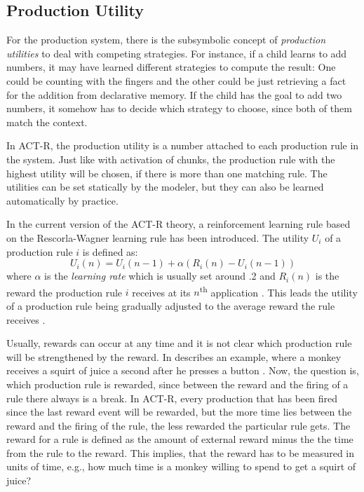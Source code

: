 \subsection{Production Utility}
\label{production_utility}

For the production system, there is the subsymbolic concept of \emph{production utilities} to deal with competing strategies. For instance, if a child learns to add numbers, it may have learned different strategies to compute the result: One could be counting with the fingers and the other could be just retrieving a fact for the addition from declarative memory. If the child has the goal to add two numbers, it somehow has to decide which strategy to choose, since both of them match the context.

In ACT-R, the production utility is a number attached to each production rule in the system. Just like with activation of chunks, the production rule with the highest utility will be chosen, if there is more than one matching rule. The utilities can be set statically by the modeler, but they can also be learned automatically by practice.

In the current version of the ACT-R theory, a reinforcement learning rule based on the Rescorla-Wagner learning rule \cite{rescorla_wagner_1972} has been introduced. The utility $U_i$ of a production rule $i$ is defined as:
\begin{equation}
\label{eq:utility_learning}
U_i(n) = U_i(n - 1) + \alpha \left(R_i(n) - U_i(n - 1)\right)
\end{equation}
where $\alpha$ is the \emph{learning rate} which is usually set around .2 and $R_i(n)$ is the reward the production rule $i$ receives at its $n$\textsuperscript{th} application \cite[160--161]{anderson_how_2007}. This leads the utility of a production rule being gradually adjusted to the average reward the rule receives \cite[6--7]{actr_tutorial}. 

Usually, rewards can occur at any time and it is not clear which production rule will be strengthened by the reward. In  \citeauthor{anderson_how_2007} describes an example, where a monkey receives a squirt of juice a second after he presses a button \cite[161]{anderson_how_2007}. Now, the question is, which production rule is rewarded, since between the reward and the firing of a rule there always is a break. In ACT-R, every production that has been fired since the last reward event will be rewarded, but the more time lies between the reward and the firing of the rule, the less rewarded the particular rule gets. The reward for a rule is defined as the amount of external reward minus the the time from the rule to the reward. This implies, that the reward has to be measured in units of time, e.g., how much time is a monkey willing to spend to get a squirt of juice? \cite[161]{anderson_how_2007}

